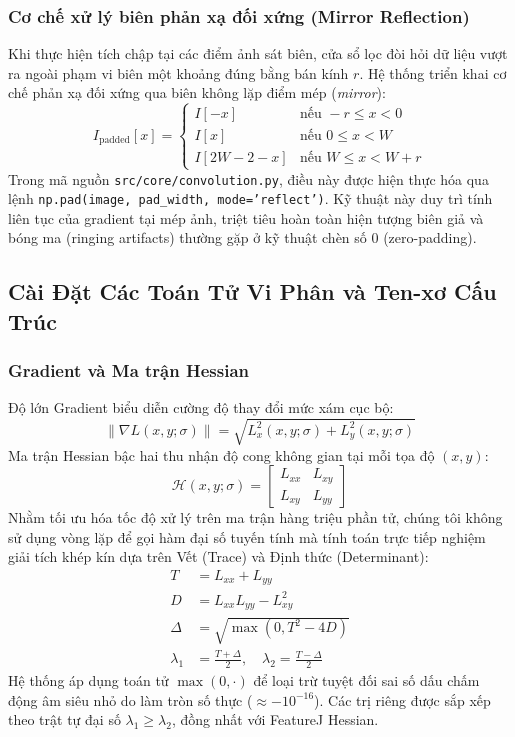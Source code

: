 \subsubsection{Cơ chế xử lý biên phản xạ đối xứng (Mirror Reflection)}
Khi thực hiện tích chập tại các điểm ảnh sát biên, cửa sổ lọc đòi hỏi dữ liệu vượt ra ngoài phạm vi biên một khoảng đúng bằng bán kính $r$. Hệ thống triển khai cơ chế phản xạ đối xứng qua biên không lặp điểm mép (\textit{mirror}):
\begin{equation}
I_{\text{padded}}[x] = \begin{cases} 
I[-x] & \text{nếu } -r \le x < 0 \\
I[x] & \text{nếu } 0 \le x < W \\
I[2W - 2 - x] & \text{nếu } W \le x < W + r
\end{cases}
\end{equation}
Trong mã nguồn \texttt{src/core/convolution.py}, điều này được hiện thực hóa qua lệnh \texttt{np.pad(image, pad\_width, mode='reflect')}. Kỹ thuật này duy trì tính liên tục của gradient tại mép ảnh, triệt tiêu hoàn toàn hiện tượng biên giả và bóng ma (ringing artifacts) thường gặp ở kỹ thuật chèn số 0 (zero-padding).

\subsection{Cài Đặt Các Toán Tử Vi Phân và Ten-xơ Cấu Trúc}
\subsubsection{Gradient và Ma trận Hessian}
Độ lớn Gradient biểu diễn cường độ thay đổi mức xám cục bộ:
\begin{equation}
\|\nabla L(x, y; \sigma)\| = \sqrt{L_x^2(x, y; \sigma) + L_y^2(x, y; \sigma)}
\end{equation}
Ma trận Hessian bậc hai thu nhận độ cong không gian tại mỗi tọa độ $(x, y)$:
\begin{equation}
\mathcal{H}(x, y; \sigma) = \begin{bmatrix} L_{xx} & L_{xy} \\ L_{xy} & L_{yy} \end{bmatrix}
\end{equation}
Nhằm tối ưu hóa tốc độ xử lý trên ma trận hàng triệu phần tử, chúng tôi không sử dụng vòng lặp để gọi hàm đại số tuyến tính mà tính toán trực tiếp nghiệm giải tích khép kín dựa trên Vết (Trace) và Định thức (Determinant):
\begin{align}
T &= L_{xx} + L_{yy} \\
D &= L_{xx} L_{yy} - L_{xy}^2 \\
\Delta &= \sqrt{\max(0, T^2 - 4D)} \\
\lambda_1 &= \frac{T + \Delta}{2}, \quad \lambda_2 = \frac{T - \Delta}{2}
\end{align}
Hệ thống áp dụng toán tử $\max(0, \cdot)$ để loại trừ tuyệt đối sai số dấu chấm động âm siêu nhỏ do làm tròn số thực ($\approx -10^{-16}$). Các trị riêng được sắp xếp theo trật tự đại số $\lambda_1 \ge \lambda_2$, đồng nhất với FeatureJ Hessian.

